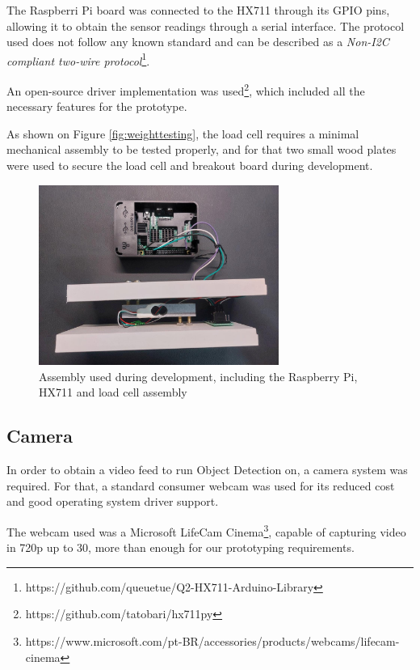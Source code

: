 \documentclass[openright]{normas-utf-tex} %
\begin{document}
The Raspberri Pi board was connected to the HX711 through its GPIO pins,
allowing it to obtain the sensor readings through a serial interface. The
protocol used does not follow any known standard and can be
described as a \textit{Non-I2C compliant two-wire
protocol}\footnote{https://github.com/queuetue/Q2-HX711-Arduino-Library}.

An open-source driver implementation was used\footnote{https://github.com/tatobari/hx711py}, 
which included all the necessary features for the prototype.

As shown on Figure \ref{fig:weighttesting}, the load cell requires a minimal
mechanical assembly to be tested properly, and for that two small wood plates
were used to secure the load cell and breakout board during development.

\begin{figure}[H]
	\centering
	\includegraphics[width=0.7\textwidth]{./images/raspberrypiwithloadcell.jpeg}
    \caption[Assembly used during development, including the Raspberry Pi, HX711 and load cell assembly]{Assembly used during development, including the Raspberry Pi, HX711 and load cell assembly}
	\label{fig:dummy}
\end{figure}

\subsection{Camera}

In order to obtain a video feed to run Object Detection on, a camera system was
required. For that, a standard consumer webcam was used for its reduced cost
and good operating system driver support.

The webcam used was a Microsoft LifeCam
Cinema\footnote{https://www.microsoft.com/pt-BR/accessories/products/webcams/lifecam-cinema},
capable of capturing video in 720p up to 30, more
than enough for our prototyping requirements.
\end{document}
